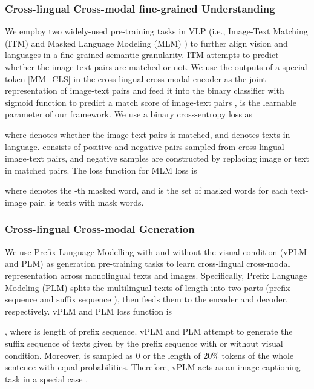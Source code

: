 \documentclass{article}
\begin{document}
\subsubsection{Cross-lingual Cross-modal fine-grained Understanding}
We employ two widely-used pre-training tasks in VLP (i.e., Image-Text Matching (ITM) and Masked Language Modeling (MLM) ) to further align vision and languages in a fine-grained semantic granularity. ITM attempts to predict whether the image-text pairs are matched or not. We use the outputs of a special token [MM\_CLS] in the cross-lingual cross-modal encoder as the joint representation of image-text pairs and feed it into the binary classifier with sigmoid function to predict a match score of image-text pairs ,  is the learnable parameter of our framework. We use a binary cross-entropy loss as

where  denotes whether the image-text pairs is matched, and  denotes texts in  language.  consists of positive and negative pairs sampled from cross-lingual image-text pairs, and negative samples are constructed by replacing image or text in matched pairs. The loss function for MLM loss is 

where  denotes the -th masked word, and  is the set of masked words for each text-image pair.  is texts with mask words.

\subsubsection{Cross-lingual Cross-modal Generation}
We use Prefix Language Modelling with and without the visual condition (vPLM and PLM) as generation pre-training tasks to learn cross-lingual cross-modal representation across monolingual texts and images. Specifically, Prefix Language Modeling (PLM) splits the multilingual texts of length  into two parts (prefix sequence  and suffix sequence ), then feeds them to the encoder and decoder, respectively. vPLM and PLM loss function is 




, where  is length of prefix sequence. vPLM and PLM attempt to generate the suffix sequence of texts  given by the prefix sequence with or without visual condition. Moreover,  is sampled as 0 or the length of 20\% tokens of the whole sentence with equal probabilities. Therefore, vPLM acts as an image captioning task in a special case .
\end{document}
